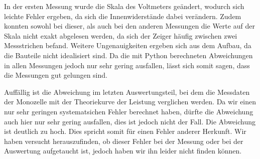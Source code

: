 In der ersten Messung wurde die Skala des Voltmeters geändert, wodurch sich leichte
Fehler ergeben, da sich die Innenwiderstände dabei verändern. Zudem konnten sowohl bei
dieser, als auch bei den anderen Messungen die Werte auf der Skala nicht exakt
abgelesen werden, da sich der Zeiger häufig zwischen zwei Messstrichen befand.
Weitere Ungenauigkeiten ergeben sich aus dem Aufbau, da die Bauteile nicht idealisiert sind.
Da die mit Python berechneten Abweichungen in allen Messungen jedoch nur sehr gering ausfallen,
lässt sich somit sagen, dass die Messungen gut gelungen sind.

Auffällig ist die Abweichung im letzten Auswertungsteil, bei dem die Messdaten der
Monozelle mit der Theoriekurve der Leistung verglichen werden. Da wir einen nur sehr geringen
systematsichen Fehler berechnet haben, dürfte die Abweichung auch hier nur sehr
gering ausfallen, dies ist jedoch nicht der Fall. Die Abweichung ist deutlich zu hoch.
Dies spricht somit für einen Fehler anderer Herkunft. Wir haben versucht herauszufinden,
ob dieser Fehler bei der Messung oder bei der Auswertung aufgetaucht ist, jedoch
haben wir ihn leider nicht finden können.
